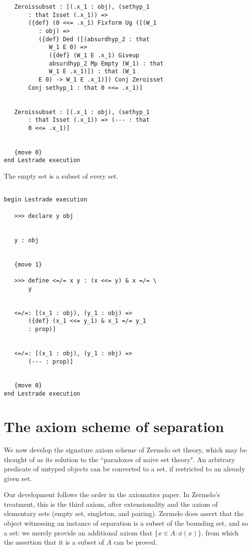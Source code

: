 \documentclass[12pt]{article}
\begin{document}
\begin{verbatim}
   Zeroissubset : [(.x_1 : obj), (sethyp_1 
       : that Isset (.x_1)) => 
       ({def} (0 <<= .x_1) Fixform Ug ([(W_1 
          : obj) => 
          ({def} Ded ([(absurdhyp_2 : that 
             W_1 E 0) => 
             ({def} (W_1 E .x_1) Giveup 
             absurdhyp_2 Mp Empty (W_1) : that 
             W_1 E .x_1)]) : that (W_1 
          E 0) -> W_1 E .x_1)]) Conj Zeroisset 
       Conj sethyp_1 : that 0 <<= .x_1)]


   Zeroissubset : [(.x_1 : obj), (sethyp_1 
       : that Isset (.x_1)) => (--- : that 
       0 <<= .x_1)]


   {move 0}
end Lestrade execution
\end{verbatim}

The empty set is a subset of every set.

\begin{verbatim}

begin Lestrade execution

   >>> declare y obj


   y : obj


   {move 1}

   >>> define <=/= x y : (x <<= y) & x =/= \
       y


   <=/=: [(x_1 : obj), (y_1 : obj) => 
       ({def} (x_1 <<= y_1) & x_1 =/= y_1 
       : prop)]


   <=/=: [(x_1 : obj), (y_1 : obj) => 
       (--- : prop)]


   {move 0}
end Lestrade execution
\end{verbatim}

\section{The axiom scheme of separation}

We now develop the signature axiom scheme of Zermelo set theory, which may be thought of as its solution to the ``paradoxes of naive set theory".  An arbitrary predicate of untyped objects can be converted to a set, if restricted to an already given set.

Our development follows the order in the axiomatics paper.  In Zermelo's treatment, this is the third axiom, after extensionality and the axiom of elementary sets
(empty set, singleton, and pairing).  Zermelo does assert that the object witnessing an instance of separation is a subset of the bounding set, and so a set:  we merely provide
an additional axiom that $\{x \in A : \phi(x)\}$, from which the assertion that it is a subset of $A$ can be proved.
\end{document}
